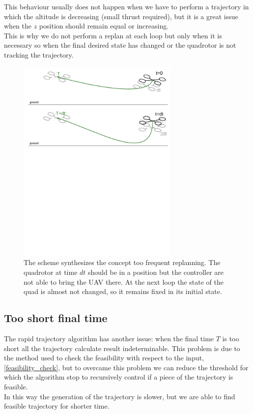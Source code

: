 This behaviour usually does not happen when we have to perform a trajectory in which the altitude is decreasing (small thrust required), but it is a great issue when the $z$ position should remain equal or increasing.\\
This is why we do not perform a replan at each loop but only when it is necessary so when the final desired state has changed or the quadrotor is not tracking the trajectory.

\begin{figure}[!htbp]
    \centering
    \includegraphics[width=0.7\textwidth]{img/frequent_replanning.pdf}
    \caption{The scheme synthesizes the concept too frequent replanning. The quadrotor at time $dt$ should be in a position but the controller are not able to bring the UAV there. At the next loop the state of the quad is almost not changed, so it remains fixed in its initial state.}
    \label{fig:freq_replan}
\end{figure}


\subsection{Too short final time}
The rapid trajectory algorithm has another issue: when the final time $T$ is too short all the trajectory calculate result indeterminable. This problem is due to the method used to check the feasibility with respect 
to the input, \ref{feasibility_check}, but to overcame this problem we can reduce the threshold for which the algorithm stop to recursively control if a piece of the trajectory is feasible.\\
In this way the generation of the trajectory is slower, but we are able to find feasible trajectory for shorter time.

